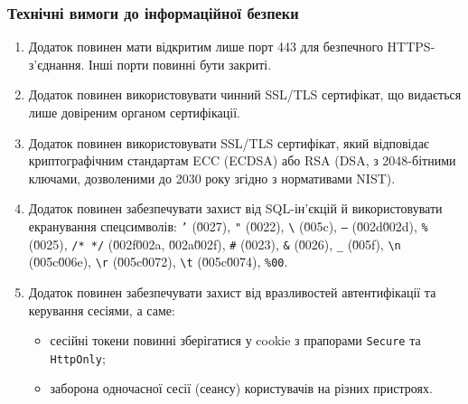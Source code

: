 \documentclass{article}
\begin{document}
\newpage
\subsubsection{Технічні вимоги до інформаційної безпеки}

\begin{enumerate}
  \item Додаток повинен мати відкритим лише порт 443 для безпечного HTTPS-з'єднання. Інші порти повинні бути закриті.

  \item Додаток повинен використовувати чинний SSL/TLS сертифікат, що видається лише довіреним органом сертифікації.

  \item Додаток повинен використовувати SSL/TLS сертифікат, який відповідає криптографічним стандартам ECC (ECDSA) або RSA (DSA, з 2048-бітними ключами, дозволеними до 2030 року згідно з нормативами NIST).

  \item Додаток повинен забезпечувати захист від SQL-ін'єкцій й використовувати екранування спецсимволів: 
  \texttt{'} (\u0027), \texttt{"} (\u0022), \texttt{\textbackslash} (\u005c), \texttt{--} (\u002d\u002d), \texttt{\%} (\u0025), \texttt{/* */} (\u002f\u002a, \u002a\u002f), \texttt{\#} (\u0023), \texttt{\&} (\u0026), \texttt{\_} (\u005f), \texttt{\textbackslash n} (\u005c\u006e), \texttt{\textbackslash r} (\u005c\u0072), \texttt{\textbackslash t} (\u005c\u0074), \texttt{\%00}.

  \item Додаток повинен забезпечувати захист від вразливостей автентифікації та керування сесіями, а саме:
    \begin{itemize}
      \item сесійні токени повинні зберігатися у cookie з прапорами \texttt{Secure} та \texttt{HttpOnly};
      \item заборона одночасної сесії (сеансу) користувачів на різних пристроях.
    \end{itemize}


\end{enumerate}
\end{document}

